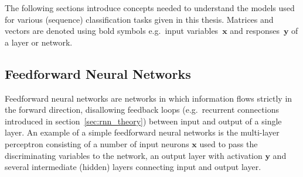 The following sections introduce concepts needed to understand the models used
for various (sequence) classification tasks given in this thesis. Matrices and
vectors are denoted using bold symbols e.g.\ input variables~$\mathbf{x}$ and
responses~$\mathbf{y}$ of a layer or network.

\subsection{Feedforward Neural Networks}
\label{sec:nn_feedforward}
Feedforward neural networks are networks in which information flows strictly in
the forward direction, disallowing feedback loops (e.g.\ recurrent connections
introduced in section~\ref{sec:rnn_theory}) between input and output of a single
layer. An example of a simple feedforward neural networks is the multi-layer
perceptron consisting of a number of input neurons $\mathbf{x}$ used to pass the
discriminating variables to the network, an output layer with activation
$\mathbf{y}$ and several intermediate (hidden) layers connecting input and
output layer.
